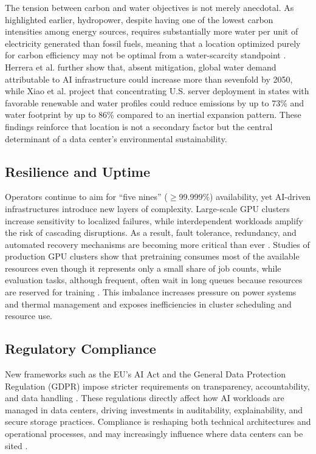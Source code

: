 \documentclass[conference]{IEEEtran}
\begin{document}
The tension between carbon and water objectives is not merely anecdotal. As highlighted earlier, hydropower, despite having one of the lowest carbon intensities among energy sources, requires substantially more water per unit of electricity generated than fossil fuels, meaning that a location optimized purely for carbon efficiency may not be optimal from a water-scarcity standpoint \cite{Jiang2025WaterWise}. Herrera et al. \cite{Herrera2025} further show that, absent mitigation, global water demand attributable to AI infrastructure could increase more than sevenfold by 2050, while Xiao et al. \cite{Xiao2025NetZero} project that concentrating U.S. server deployment in states with favorable renewable and water profiles could reduce emissions by up to 73\% and water footprint by up to 86\% compared to an inertial expansion pattern. These findings reinforce that location is not a secondary factor but the central determinant of a data center's environmental sustainability.

\subsection{Resilience and Uptime}

Operators continue to aim for ``five nines'' ($\geq$99.999\%) availability, yet AI-driven infrastructures introduce new layers of complexity. Large-scale GPU clusters increase sensitivity to localized failures, while interdependent workloads amplify the risk of cascading disruptions. As a result, fault tolerance, redundancy, and automated recovery mechanisms are becoming more critical than ever \cite{Zakarya2024}. Studies of production GPU clusters show that pretraining consumes most of the available resources even though it represents only a small share of job counts, while evaluation tasks, although frequent, often wait in long queues because resources are reserved for training \cite{Zakarya2024}. This imbalance increases pressure on power systems and thermal management and exposes inefficiencies in cluster scheduling and resource use.

\subsection{Regulatory Compliance}

New frameworks such as the EU's AI Act and the General Data Protection Regulation (GDPR) impose stricter requirements on transparency, accountability, and data handling \cite{Halgamuge2026}. These regulations directly affect how AI workloads are managed in data centers, driving investments in auditability, explainability, and secure storage practices. Compliance is reshaping both technical architectures and operational processes, and may increasingly influence where data centers can be sited \cite{Zakarya2024}.
\end{document}
